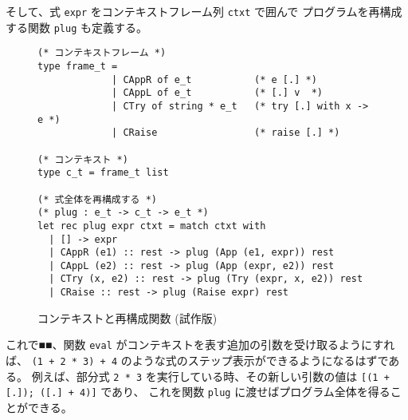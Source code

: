 そして、式 \texttt{expr} をコンテキストフレーム列 \texttt{ctxt} で囲んで
プログラムを再構成する関数 \texttt{plug} も定義する。

\begin{figure}
\begin{spacing}{0.8}
\begin{verbatim}
(* コンテキストフレーム *)
type frame_t = 
             | CAppR of e_t           (* e [.] *)
             | CAppL of e_t           (* [.] v  *)
             | CTry of string * e_t   (* try [.] with x -> e *)
             | CRaise                 (* raise [.] *)

(* コンテキスト *)
type c_t = frame_t list

(* 式全体を再構成する *)
(* plug : e_t -> c_t -> e_t *)
let rec plug expr ctxt = match ctxt with
  | [] -> expr
  | CAppR (e1) :: rest -> plug (App (e1, expr)) rest
  | CAppL (e2) :: rest -> plug (App (expr, e2)) rest
  | CTry (x, e2) :: rest -> plug (Try (expr, x, e2)) rest
  | CRaise :: rest -> plug (Raise expr) rest
\end{verbatim}
\end{spacing}
\caption{コンテキストと再構成関数 (試作版)}
\label{figure:simpleplug}
\end{figure}

これで■■、関数 \texttt{eval} がコンテキストを表す追加の引数を受け取るようにすれば、
\texttt{(1 + 2 * 3) + 4} のような式のステップ表示ができるようになるはずである。
例えば、部分式 \texttt{2 * 3} を実行している時、その新しい引数の値は
\texttt{[(1 + [.]);\ ([.]\ + 4)]} であり、
これを関数 \texttt{plug} に渡せばプログラム全体を得ることができる。

